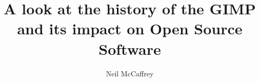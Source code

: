 \documentclass[12pt]{article}
\begin{document}
\title{A look at the history of the GIMP and its impact on Open Source
Software}
\author{Neil McCaffrey}
\date{}
\maketitle
\end{document}
